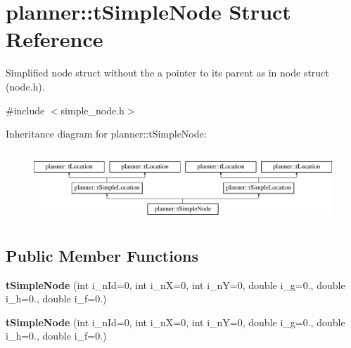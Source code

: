 \hypertarget{structplanner_1_1t_simple_node}{}\section{planner\+:\+:t\+Simple\+Node Struct Reference}
\label{structplanner_1_1t_simple_node}


Simplified node struct without the a pointer to its parent as in node struct (node.\+h).  




{\ttfamily \#include $<$simple\+\_\+node.\+h$>$}

Inheritance diagram for planner\+:\+:t\+Simple\+Node\+:\begin{figure}[H]
\begin{center}
\leavevmode
\includegraphics[height=2.675159cm]{structplanner_1_1t_simple_node}
\end{center}
\end{figure}
\subsection*{Public Member Functions}
\begin{DoxyCompactItemize}
\item 
\mbox{\label{structplanner_1_1t_simple_node_a2351b76c262d06c2a2994c2ccdc5b01c}} 
{\bfseries t\+Simple\+Node} (int i\+\_\+n\+Id=0, int i\+\_\+nX=0, int i\+\_\+nY=0, double i\+\_\+g=0., double i\+\_\+h=0., double i\+\_\+f=0.)
\item 
\mbox{\label{structplanner_1_1t_simple_node_a2351b76c262d06c2a2994c2ccdc5b01c}} 
{\bfseries t\+Simple\+Node} (int i\+\_\+n\+Id=0, int i\+\_\+nX=0, int i\+\_\+nY=0, double i\+\_\+g=0., double i\+\_\+h=0., double i\+\_\+f=0.)
\end{DoxyCompactItemize}
